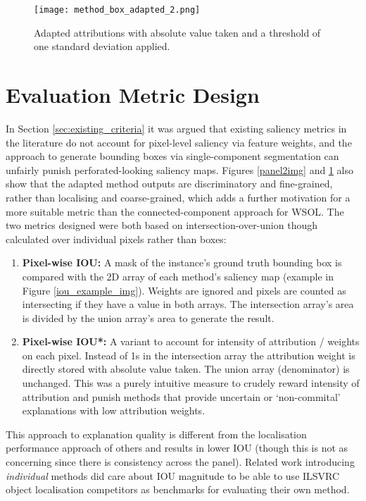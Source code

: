 \documentclass[main]{subfiles}
\begin{document}
\begin{figure}[htbp]
\centering
\texttt{[image: method\_box\_adapted\_2.png]}
\caption{Adapted attributions with absolute value taken and a threshold of one standard deviation applied.}
\label{panel3img}
\end{figure}


\newpage


\section{Evaluation Metric Design} \label{sec:metric}

In Section \ref{sec:existing_criteria} it was argued that existing saliency metrics in the literature do not account for pixel-level saliency via feature weights, and the approach to generate bounding boxes via single-component segmentation can unfairly punish perforated-looking saliency maps. Figures \ref{panel2img} and \ref{panel3img} also show that the adapted method outputs are discriminatory and fine-grained, rather than localising and coarse-grained, which adds a further motivation for a more suitable metric than the connected-component approach for WSOL. The two metrics designed were both based on intersection-over-union though calculated over individual pixels rather than boxes:

\begin{enumerate}
\item \textbf{Pixel-wise IOU:} A mask of the instance's ground truth bounding box is compared with the 2D array of each method's saliency map (example in Figure \ref{iou_example_img}). Weights are ignored and pixels are counted as intersecting if they have a value in both arrays. The intersection array's area is divided by the union array's area to generate the result.

\item \textbf{Pixel-wise IOU*:} A variant to account for intensity of attribution / weights on each pixel. Instead of 1s in the intersection array the attribution weight is directly stored with absolute value taken. The union array (denominator) is unchanged. This was a purely intuitive measure to crudely reward intensity of attribution and punish methods that provide uncertain or `non-commital' explanations with low attribution weights.

\end{enumerate}

This approach to explanation quality is different from the localisation performance approach of others and results in lower IOU (though this is not as concerning since there is consistency across the panel). Related work introducing \textit{individual} methods did care about IOU magnitude to be able to use ILSVRC object localisation competitors as benchmarks for evaluating their own method.
\end{document}
